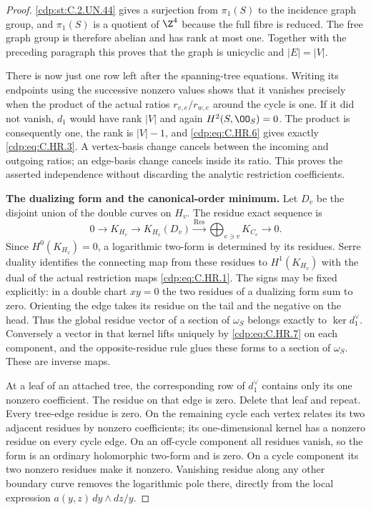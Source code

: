 \begin{proof}
\ref{cdp:st:C.2.UN.44} gives a surjection from $\pi_1(S)$ to the incidence
graph group, and $\pi_1(S)$ is a quotient of $\Z^4$ because the
full fibre is reduced. The free graph group is therefore abelian
and has rank at most one. Together with the preceding paragraph
this proves that the graph is unicyclic and $|E|=|V|$.

There is now just one row left after the spanning-tree equations.
Writing its endpoints using the successive nonzero values shows
that it vanishes precisely when the product of the actual ratios
$r_{v,e}/r_{w,e}$ around the cycle is one. If it did not vanish,
$d_1$ would have rank $|V|$ and again $H^2(S,\OO_S)=0$.
The product is consequently one, the rank is $|V|-1$, and
\eqref{cdp:eq:C.HR.6} gives exactly \eqref{cdp:eq:C.HR.3}. A vertex-basis change cancels
between the incoming and outgoing ratios; an edge-basis change
cancels inside its ratio. This proves the asserted independence
without discarding the analytic restriction coefficients.

\par\medskip\noindent\textbf{The dualizing form and the canonical-order minimum.}
Let $D_v$ be the disjoint union of the double curves on $H_v$.
The residue exact sequence is
\[
 0\longrightarrow K_{H_v}
 \longrightarrow K_{H_v}(D_v)
 \xrightarrow{\operatorname{Res}}\bigoplus_{e\ni v}K_{C_e}
 \longrightarrow0.                                    \tag{C.HR.7}\label{cdp:eq:C.HR.7}
\]
Since $H^0(K_{H_v})=0$, a logarithmic two-form is determined by
its residues. Serre duality identifies the connecting map from
these residues to $H^1(K_{H_v})$ with the dual of the actual
restriction maps \eqref{cdp:eq:C.HR.1}. The signs may be fixed explicitly:
in a double chart $xy=0$ the two residues of a dualizing form
sum to zero. Orienting the edge takes its residue on the tail
and the negative on the head. Thus the global residue vector of
a section of $\omega_S$ belongs exactly to $\ker d_1^\vee$.
Conversely a vector in that kernel lifts uniquely by \eqref{cdp:eq:C.HR.7} on
each component, and the opposite-residue rule glues these forms
to a section of $\omega_S$. These are inverse maps.

At a leaf of an attached tree, the corresponding row of
$d_1^\vee$ contains only its one nonzero coefficient. The
residue on that edge is zero. Delete that leaf and repeat.
Every tree-edge residue is zero. On the remaining cycle each
vertex relates its two adjacent residues by nonzero coefficients;
its one-dimensional kernel has a nonzero residue on every cycle
edge. On an off-cycle component all residues vanish, so the
form is an ordinary holomorphic two-form and is zero. On a cycle
component its two nonzero residues make it nonzero. Vanishing
residue along any other boundary curve removes the logarithmic
pole there, directly from the local expression
$a(y,z)\,dy\wedge dz/y$.


\end{proof}
